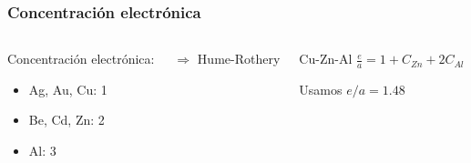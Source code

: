 \documentclass[usenames,dvipsnames]{beamer}
\begin{document}

\begin{frame}

\frametitle{Concentración electrónica}

\begin{columns}
\begin{block}{
Concentración electrónica:
}

\begin{small}
\begin{itemize}
 \item Ag, Au, Cu: 1
 \item Be, Cd, Zn: 2
 \item Al: 3
\end{itemize}
\end{small}
\end{block}
$\Longrightarrow$ Hume-Rothery


\begin{block}{Cu-Zn-Al
}
$\frac{e}{a} = 1+C_{Zn}+2C_{Al}$

Usamos $e/a=1.48$
\end{block}
  

\end{columns}
\end{frame}
\end{document}
